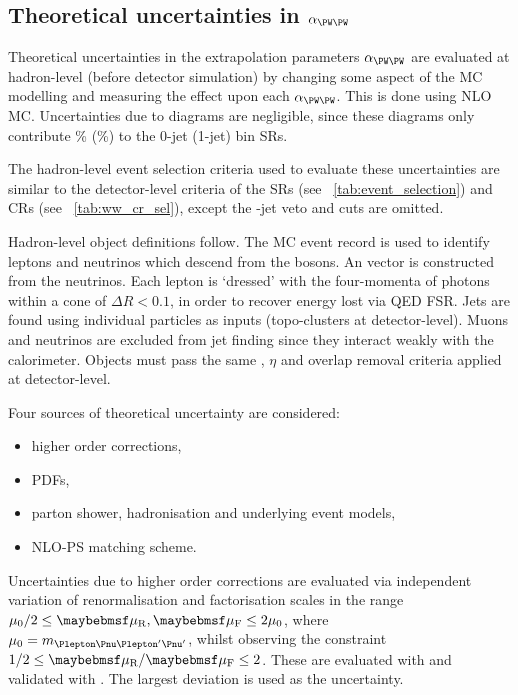 \subsection{Theoretical uncertainties in $\alpha_{\WW}$}
\label{sec:ww_bkg:alpha}

Theoretical uncertainties in the extrapolation parameters $\alpha_{\WW}$ are evaluated 
at hadron-level (\ie before detector simulation) by changing some aspect of the MC 
modelling and measuring the effect upon each $\alpha_{\WW}$. This is done using NLO \WW 
MC. Uncertainties due to \ggWW diagrams are negligible, since these diagrams only 
contribute \% (\%) to the 0-jet (1-jet) bin SRs.

The hadron-level event selection criteria used to evaluate these uncertainties are similar to 
the detector-level criteria of the SRs (see \Table~\ref{tab:event_selection}) and CRs (see 
\Table~\ref{tab:ww_cr_sel}), except the \Pbottom-jet veto and \frecoil cuts are omitted.

Hadron-level object definitions follow. The MC event record is used to identify leptons 
and neutrinos which descend from the \PW bosons. An \metvec vector is constructed from 
the neutrinos. Each lepton is `dressed' with the four-momenta of photons within a cone of 
$\Delta R < 0.1$, in order to recover energy lost via QED FSR. Jets are found using 
individual particles as inputs (\cf topo-clusters at detector-level). Muons and neutrinos 
are excluded from jet finding since they interact weakly with the calorimeter. Objects 
must pass the same \pt, $\eta$ and overlap removal criteria applied at detector-level.

Four sources of theoretical uncertainty are considered:
\begin{itemize}[noitemsep,nolistsep]
	\item higher order corrections,
	\item PDFs,
	\item parton shower, hadronisation and underlying event models,
	\item NLO-PS matching scheme.
\end{itemize}

Uncertainties due to higher order corrections are evaluated via independent variation of 
renormalisation and factorisation scales in the range $\mu_0/2 \leq \mur,\muf 
\leq 2\mu_0$, where $\mu_0 = m_{\HepProcess{\Plepton\Pnu\Plepton'\Pnu'}}$, whilst observing 
the constraint $1/2 \leq \mur/\muf \leq 2$. These are evaluated with \amcatnlo and validated 
with \mcfm. The largest deviation is used as the uncertainty.

